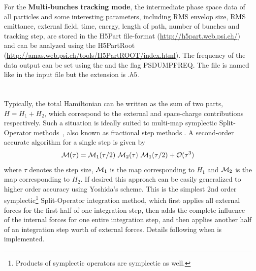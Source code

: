 For the {\bfseries Multi-bunches tracking mode}, the intermediate phase space data of all particles and some interesting parameters, 
including RMS envelop size, RMS emittance, external field, time, energy, length of path, number of bunches and 
tracking step, are stored in the H5Part file-format (\url{http://h5part.web.psi.ch/}) and can be analyzed
using the H5PartRoot (\url{http://amas.web.psi.ch/tools/H5PartROOT/index.html}). The frequency 
of the data output can be set using the  and the flag PSDUMPFREQ. 
The file is named like in the input file but the extension is $.h5$. 

\section{\opalmap} \label{sec:SplitOperatorMethods}

Typically, the total Hamiltonian can be written as the sum of two parts, $H = H_{1} + H_{2}$,
which correspond to the external and space-charge contributions respectively.
Such a situation is ideally suited to multi-map
symplectic Split-Operator methods~\cite{forestall}, also known as fractional step methods \cite{SanzSerna}.
A second-order accurate algorithm for a single step is given by
\begin{equation} \label{eq:splitOper1}
{\cal M}(\tau)={\cal M}_1(\tau/2)~{\cal M}_2(\tau)~{\cal M}_1(\tau/2) + \mathcal{O}(\tau^3)
\end{equation}
where $\tau$ denotes the step size, ${\cal M}_1$ is the map corresponding
to $H_{1}$  and ${\cal M}_2$ is the map corresponding to $H_{2}$.
If desired this approach can be
easily generalized to higher order accuracy using Yoshida's
scheme. %
This is the simplest 2nd order symplectic\footnote{Products of symplectic operators are symplectic as well.} Split-Operator integration method, which first applies all external forces for the first half of one integration step, then adds the complete influence of the internal forces for one entire integration step, and then applies another half of an integration step worth of external forces.
Details following when \opalmap is implemented.









